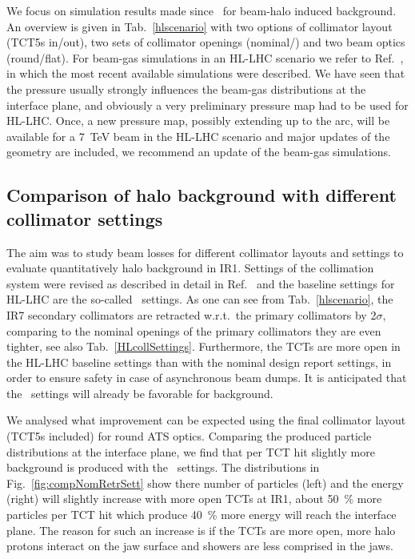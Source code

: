 We focus on simulation results made since~\cite{kweeIpac14} for beam-halo induced background. An overview is given in Tab.~\ref{hlscenario} with two options of collimator layout (TCT5s in/out), two sets of collimator openings (nominal/\twosigmaret) and two beam optics (round/flat). For beam-gas simulations in an HL-LHC scenario we refer to Ref.~\cite{kweeIpac14}, in which the most recent available simulations were described. We have seen that the pressure usually strongly influences the beam-gas distributions at the interface plane, and obviously a very preliminary pressure map had to be used for HL-LHC. Once, a new pressure map, possibly extending up to the arc, will be available for a 7~TeV beam in the HL-LHC scenario and major updates of the geometry are included, we recommend an update of the beam-gas simulations. 

\subsection{Comparison of halo background with different collimator settings}

The aim was to study beam losses for different collimator layouts and settings to evaluate quantitatively halo background in IR1. Settings of the collimation system were revised as described in detail in Ref.~\cite{collSettRef} and the baseline settings for HL-LHC are the so-called \twosigmaret~settings. As one can see from Tab.~\ref{hlscenario}, the IR7 secondary collimators are retracted w.r.t.~the primary collimators by 2$\sigma$, comparing to the nominal openings of the primary collimators they are even tighter, see also Tab.~\ref{HLcollSettings}. Furthermore, the TCTs are more open in the HL-LHC baseline settings than with the nominal design report settings, in order to ensure safety in case of asynchronous beam dumps. It is anticipated that the \twosigmaret~settings will already be favorable for background.

We analysed what improvement can be expected using the final collimator layout (TCT5s included) for round ATS optics. Comparing the produced particle distributions at the interface plane, we find that per TCT hit slightly more background is produced with the \twosigmaret~settings. The distributions in Fig.~\ref{fig:compNomRetrSett} show there number of particles (left) and the energy (right) will slightly increase with more open TCTs at IR1, about 50~\% more particles per TCT hit which produce 40~\% more energy will reach the interface plane. The reason for such an increase is if the TCTs are more open, more halo protons interact on the jaw surface and showers are less comprised in the jaws. %

